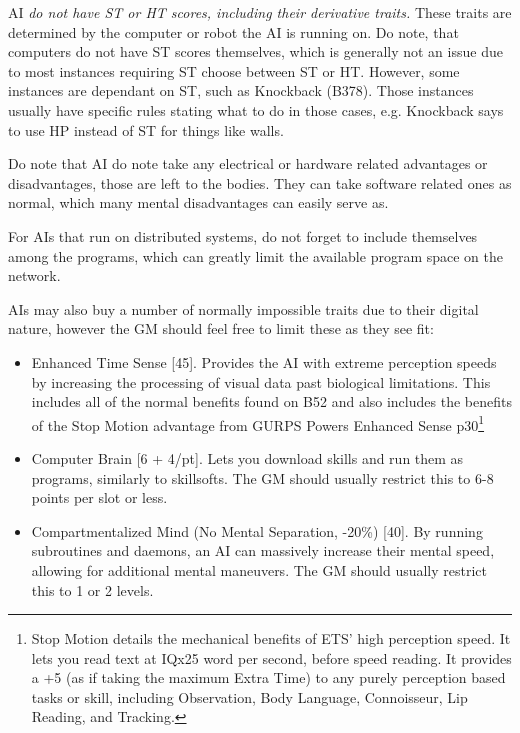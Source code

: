 \begin{multicols*}{3}
	AI \textit{do not have ST or HT scores, including their derivative traits.} These traits are determined by the computer or robot the AI is running on. Do note, that computers do not have ST scores themselves, which is generally not an issue due to most instances requiring ST choose between ST or HT. However, some instances are dependant on ST, such as Knockback (B378). Those instances usually have specific rules stating what to do in those cases, e.g. Knockback says to use HP instead of ST for things like walls.
	
	Do note that AI do note take any electrical or hardware related advantages or disadvantages, those are left to the bodies. They can take software related ones as normal, which many mental disadvantages can easily serve as.
	
	For AIs that run on distributed systems, do not forget to include themselves among the programs, which can greatly limit the available program space on the network.
	
	AIs may also buy a number of normally impossible traits due to their digital nature, however the GM should feel free to limit these as they see fit:
	
	\begin{itemize}
		\itemsep 0pt
		\item Enhanced Time Sense [45]. Provides the AI with extreme perception speeds by increasing the processing of visual data past biological limitations. This includes all of the normal benefits found on B52 and also includes the benefits of the Stop Motion advantage from GURPS Powers Enhanced Sense p30\footnote{Stop Motion details the mechanical benefits of ETS' high perception speed. It lets you read text at IQx25 word per second, before speed reading. It provides a +5 (as if taking the maximum Extra Time) to any purely perception based tasks or skill, including Observation, Body Language, Connoisseur, Lip Reading, and Tracking.}
		\item Computer Brain [6 + 4/pt]. Lets you download skills and run them as programs, similarly to skillsofts. The GM should usually restrict this to 6-8 points per slot or less.
		\item Compartmentalized Mind (No Mental Separation, -20\%) [40]. By running subroutines and daemons, an AI can massively increase their mental speed, allowing for additional mental maneuvers. The GM should usually restrict this to 1 or 2 levels.
	\end{itemize}
	

\end{multicols*}
